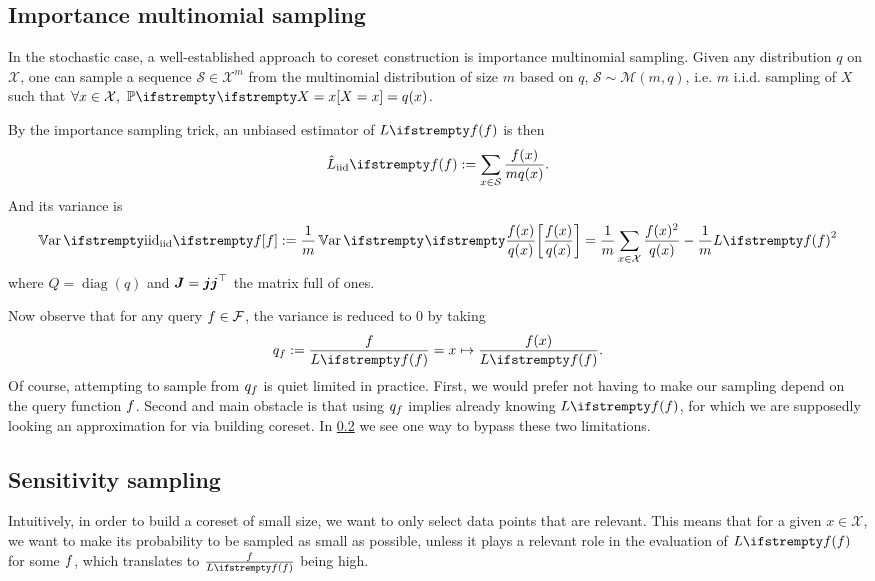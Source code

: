 \subsection{Importance multinomial sampling}

In the stochastic case, a well-established approach to coreset construction is importance multinomial sampling. Given any distribution $q$ on $\mathcal{X}$, one can sample a sequence $\mathcal{S} \in \mathcal{X}^m$ from the multinomial distribution of size $m$ based on $q$, $\mathcal S \sim \mathcal M(m, q)$, i.e. $m$ i.i.d. sampling of $X$ such that $\forall x \in \mathcal{X},\ \PP{}{X=x} = q(x)$.

By the importance sampling trick, an unbiased estimator of $\loss{\query}$ is then
\begin{equation*}
	\estloss{\textrm{iid}}{\query} := \sum_{x\in \mathcal S} \frac{\query(x)}{m q(x)}.
\end{equation*}
And its variance is
\begin{equation*}
	\Var{\textrm{iid}}{\query} :=\frac{1}{m} \Var{}{\frac {\query(x)} {q(x)}}
	=\frac{1}{m} \sum_{x \in \mathcal{X}} \frac{\query(x)^{2}}{q(x)} -\frac{1}{m} \loss{\query}^{2}
\end{equation*}
where $Q = \operatorname{diag}(q)$ and $\boldsymbol{J} = \boldsymbol{j} \boldsymbol{j} ^\top$ the matrix full of ones. 


Now observe that for any query $f \in \mathcal{F}$, the variance is reduced to 0 by taking
\begin{equation*}
    q_{\query} :=\frac{ \query}{\loss{\query}} = x \mapsto \frac{ \query(x)}{\loss{\query}}.
\end{equation*}
Of course, attempting to sample from $q_f$ is quiet limited in practice. First, we would prefer not having to make our sampling depend on the query function $f$. Second and main obstacle is that using $q_f$ implies already knowing $\loss{\query}$, for which we are supposedly looking an approximation for via building coreset. In \cref{sect_senstsampl} we see one way to bypass these two limitations.

\subsection{Sensitivity sampling}
\label{sect_senstsampl}



Intuitively, in order to build a coreset of small size, we want to only select data points that are relevant. This means that for a given $x \in \mathcal{X}$, we want to make its probability to be sampled as small as possible, unless it plays a relevant role in the evaluation of $\loss{\query}$ for some $f$, which translates to $\frac{\query}{\loss{\query}}$ being high.

